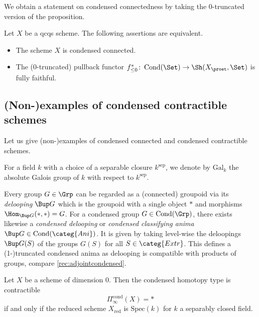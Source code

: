 \documentclass[leqno]{article}
\renewcommand{\Gal}{\mathrm{Gal}}
\newcommand{\Ani}{\categ{Ani}}
\DeclareMathOperator{\Cond}{Cond}
\newcommand{\CondAni}{\Cond(\Ani)}
\newcommand{\CondSet}{\Cond(\Set)}
\newcommand{\CondGrp}{\Cond(\Grp)}
\newcommand{\Extr}{\categ{Extr}}
\newcommand{\cond}{\mathrm{cond}}
\DeclareMathOperator{\BGal}{BGal}
\newcommand{\Picond}{\Pi_{\infty}^{\cond}}
\newcommand{\CondShape}[1]{\Picond(#1)}
\renewcommand{\Spec}{\mathrm{Spec}}
\begin{document}
%
We obtain a statement on condensed connectedness by taking the $0$-truncated version of the proposition.
%
\begin{corollary} Let $X$ be a qcqs scheme. The following assertions are equivalent.
\begin{itemize}
    \item[(i)] The scheme $X$ is condensed connected.
    \item[(ii)] The ($0$-truncated) pullback functor 
    $f^*_{\leq 0}\colon \CondSet \rightarrow \Sh(X_{\proet},\Set)$ is fully faithful.
\end{itemize}
\end{corollary}
%
\subsection{(Non-)examples of condensed contractible schemes}
Let us give (non-)examples of condensed connected and condensed contractible schemes.
\begin{notation}
For a field $k$ with a choice of a separable closure $k^{\mathrm{sep}}$, we denote by $\Gal_k$ the absolute Galois group of $k$ with respect to $k^{\mathrm{sep}}$. 
\end{notation}
%
\begin{recollection}
Every group $G\in \Grp$ can be regarded as a (connected) groupoid via its \textit{delooping} $\Bup G$ which is the groupoid with a single object $\ast$ and morphisms $\Hom_{\Bup G}(\ast,\ast)=G$. For a condensed group $G\in \CondGrp$, there exists likewise a \textit{condensed delooping} or \textit{condensed classifying anima} $\Bup G\in \CondAni$. It is given by taking level-wise the deloopings $\Bup G(S)$ of the groups $G(S)$ for all $S\in \Extr$. This defines a (1-)truncated condensed anima as delooping is compatible with products of groups, compare \cref{rec:adjointcondensed}.
\end{recollection}
%
%
\begin{lemma}{\cites[Corollary 3.42]{The_condensed_homotopy_type}[Lemma 2.4.5]{CatrinsThesis}}
Let $X$ be a scheme of dimension $0$. 
Then the condensed homotopy type is contractible $$\CondShape{X}=\ast$$ if and only if the reduced scheme $X_{\mathrm{red}}$ is $\Spec(k)$ for $k$ a separably closed field.
\end{lemma}
\end{document}
